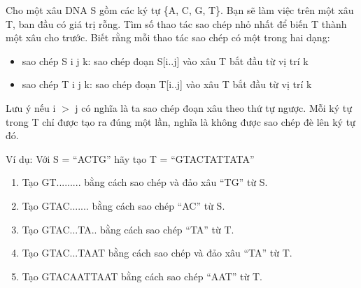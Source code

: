 Cho một xâu DNA S gồm các ký tự \{A, C, G, T\}. Bạn sẽ làm việc trên một xâu T, ban đầu có giá trị rỗng. Tìm số thao tác sao chép nhỏ nhất để biến T thành một xâu cho trước. Biết rằng mỗi thao tác sao chép có một trong hai dạng:  
\begin{itemize}
	\item     sao chép S i j k: sao chép đoạn S[i..j] vào xâu T bắt đầu từ vị trí k   
	\item     sao chép T i j k: sao chép đoạn T[i..j] vào xâu T bắt đầu từ vị trí k   
\end{itemize}

   Lưu ý nếu i $>$ j có nghĩa là ta sao chép đoạn xâu theo thứ tự ngược. Mỗi ký tự trong T chỉ được tạo ra đúng một lần, nghĩa là không được sao chép đè lên ký tự đó.  

   Ví dụ: Với S = “ACTG” hãy tạo T = “GTACTATTATA”  
\begin{enumerate}
	\item     Tạo GT......... bằng cách sao chép và đảo xâu “TG” từ S.   
	\item     Tạo GTAC....... bằng cách sao chép “AC” từ S.   
	\item     Tạo GTAC...TA.. bằng cách sao chép “TA” từ T.   
	\item     Tạo GTAC...TAAT bằng cách sao chép và đảo xâu “TA” từ T.   
	\item     Tạo GTACAATTAAT bằng cách sao chép “AAT” từ T.   
\end{enumerate}